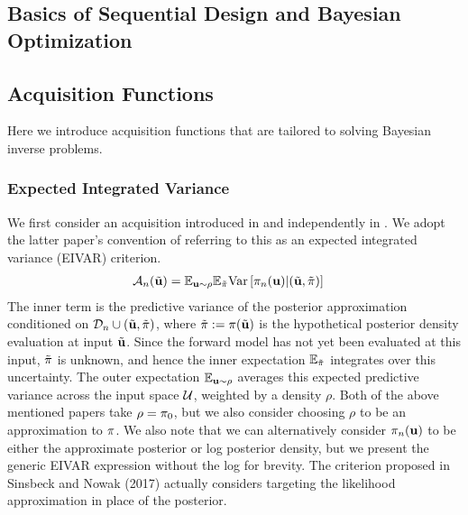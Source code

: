 \documentclass[12pt]{article}
\begin{document}
\subsection{Basics of Sequential Design and Bayesian Optimization}

\subsection{Acquisition Functions}
Here we introduce acquisition functions that are tailored to solving Bayesian inverse problems. 

\subsubsection{Expected Integrated Variance}
We first consider an acquisition introduced in \cite{SinsbeckNowak} and independently 
in \cite{Surer2023sequential}. We adopt the latter paper's convention of referring to this as an expected integrated variance (EIVAR) criterion. 
\begin{align}
\acq[\designIdx](\tilde{\bpar}) &= \E_{\bpar \sim \rho} \E_{\tilde{\postDens}} \Var\left[\postDens_{\designIdx}(\bpar) | (\tilde{\bpar}, \tilde{\postDens}) \right] \label{EIVAR}
\end{align}
The inner term is the predictive variance of the posterior approximation conditioned on $\designData_{\designIdx} \cup (\tilde{\bpar}, \tilde{\postDens})$, where 
$\tilde{\postDens} := \postDens(\tilde{\bpar})$ is the hypothetical posterior density evaluation at input $\tilde{\bpar}$. Since the forward model has not yet been evaluated at 
this input, $\tilde{\postDens}$ is unknown, and hence the inner expectation $\E_{\tilde{\postDens}}$ integrates over this uncertainty. The outer expectation $\E_{\bpar \sim \rho}$
averages this expected predictive variance across the input space $\parSpace$, weighted by a density $\rho$. Both of the above mentioned papers take $\rho = \priorDens$, but we 
also consider choosing $\rho$ to be an approximation to $\postDens$. We also note that we can alternatively consider $\postDens_{\designIdx}(\bpar)$ to be either the 
approximate posterior or log posterior density, but we present the generic EIVAR expression without the log for brevity. The criterion proposed in Sinsbeck and Nowak (2017) actually 
considers targeting the likelihood approximation in place of the posterior. 
\end{document}
